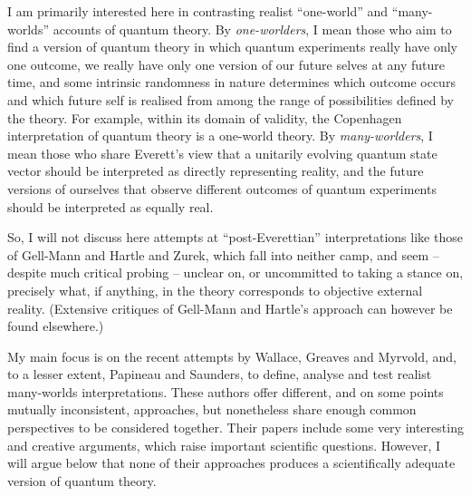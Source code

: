 \documentclass[aps,
pra,epsfig]{revtex4}
\begin{document}
I am primarily interested here in contrasting realist ``one-world'' and
``many-worlds'' accounts of quantum theory.  By {\it one-worlders}, I mean
those who aim to find a version of quantum theory in which quantum
experiments really have only one outcome, we really have only one
version of our future selves at any future time, and some intrinsic
randomness in nature determines which outcome occurs and which future
self is realised from among the range of possibilities defined by the
theory.  For example, within its domain of validity, the Copenhagen
interpretation of quantum theory is a one-world theory.  By
{\it many-worlders}, I mean those who share Everett's view that a unitarily
evolving quantum state vector should be interpreted as directly
representing reality, and the future versions of ourselves that
observe different outcomes of quantum experiments should be
interpreted as equally real.

So, I will not discuss here attempts at ``post-Everettian''
interpretations like those of Gell-Mann and Hartle\cite{hartlevol} and
Zurek\cite{zurekvol}, which fall into neither camp, and 
seem -- despite much critical probing -- unclear on, or uncommitted to 
taking a stance on, precisely what, if
anything, in the theory corresponds to objective external reality.
(Extensive critiques of Gell-Mann and Hartle's approach
can however be found 
elsewhere\cite{dowkerkentone, dowkerkenttwo, 
kentone, kenttwo, kentthree, kentfour}.)

My main focus is on the recent attempts by 
Wallace\cite{wallacevolone, wallacevoltwo}, Greaves and 
Myrvold\cite{greavesmyrvoldvol}, and, to a lesser extent, 
Papineau\cite{papineauvol} and Saunders\cite{saundersvol}, 
to define, analyse and test realist many-worlds 
interpretations.  These authors offer
different, and on some points mutually inconsistent, approaches, but
nonetheless share enough common perspectives to be considered
together.  Their papers include some very interesting and creative
arguments, which raise important scientific questions.  However, I
will argue below that none of their approaches produces a
scientifically adequate version of quantum theory.
\end{document}
